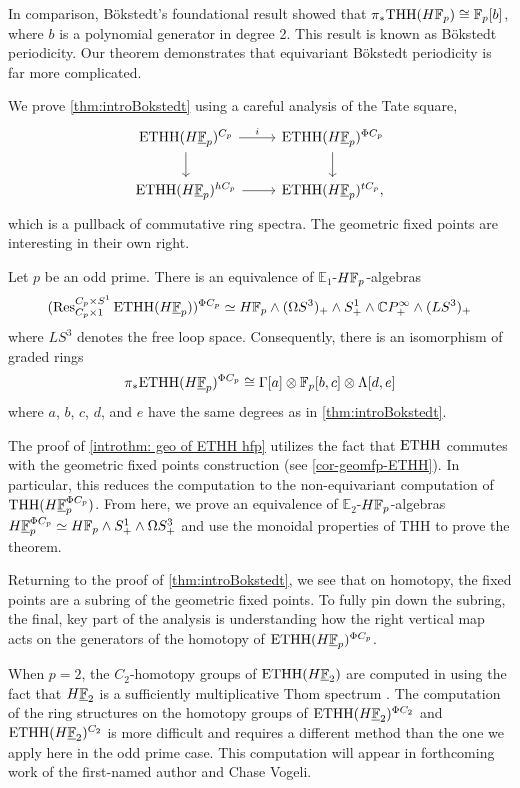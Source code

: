 In comparison, B\"okstedt's foundational result showed that $\pi_*\mathrm{THH}(H\mathbb{F} _p) \cong \mathbb{F} _p [b]$, where $b$ is a polynomial generator in degree 2. This result is known as B\"okstedt periodicity. Our theorem demonstrates that equivariant B\"okstedt periodicity is far more complicated. 

We prove \cref{thm:introBokstedt} using a careful analysis of the Tate square,
\[
    \begin{tikzcd}
        \ETHH(\HFp)^{C_p}\ar[r,"i"] \ar[d] & \ETHH(\HFp)\geop \ar[d]\\
        \ETHH(\HFp)^{hC_p} \ar[r] & \ETHH(\HFp)^{tC_p},
    \end{tikzcd}
\]
which is a pullback of commutative ring spectra. The geometric fixed points are interesting in their own right.


\begin{introtheorem}\label{introthm: geo of ETHH hfp}
    Let $p$ be an odd prime.  There is an equivalence of $\mathbb{E}_1$-$H\mathbb{F}_p$-algebras 
    \[
        (\ethh(\HFp))\geop \simeq H\F_p \wedge (\Omega S^3)_+ \wedge S^1_+ \wedge \C P^\infty _+ \wedge (LS^3)_+ 
    \]
    where $LS^3$ denotes the free loop space. Consequently, there is an isomorphism of graded rings
    \[
        \pi_*\ETHH(\HFp)\geop\cong \Gamma[a]\otimes\F_p[b,c]\otimes \Lambda[d,e]
    \]
    where $a$, $b$, $c$, $d$, and $e$ have the same degrees as in \cref{thm:introBokstedt}.
\end{introtheorem}

The proof of \cref{introthm: geo of ETHH hfp} utilizes the fact that $\mathrm{ETHH}$ commutes with the geometric fixed points construction (see \cref{cor-geomfp-ETHH}). In particular, this reduces the computation to the non-equivariant computation of $\THH(\HFp\geop)$. From here, we prove an equivalence of $\mathbb{E}_2$-$H\mathbb{F}_p$-algebras $\HFp\geop\simeq H\F_p\wedge S^1_+\wedge \Omega S^3_+$ and use the monoidal properties of THH to prove the theorem.

Returning to the proof of \cref{thm:introBokstedt}, we see that on homotopy, the fixed points are a subring of the geometric fixed points. To fully pin down the subring, the final, key part of the analysis is understanding how the right vertical map acts on the generators of the homotopy of $\ETHH(\HFp)\geop$.




When $p=2$, the $C_2$-homotopy groups of $\mathrm{ETHH}(H\underline{\mathbb{F}}_2)$ are computed in \cite{AGHKK22} using the fact that $H\underline{\mathbb{F}}_2$ is a sufficiently multiplicative Thom spectrum \cite{BW18,HW20}. The computation of the ring structures on the homotopy groups of $\ETHH(H\underline{\F}_2)\geo[C_2]$ and $\mathrm{ETHH}(H\underline{\mathbb{F}}_2)^{C_2}$ is more difficult and requires a different method than the one we apply here in the odd prime case.  This computation will appear in forthcoming work of the first-named author and Chase Vogeli. 

